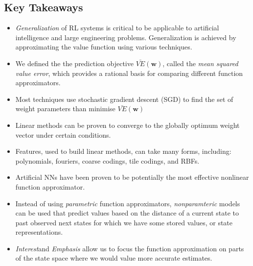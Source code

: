 \subsection{Key Takeaways}
\begin{itemize}
\item \textit{Generalization} of RL systems is critical to be applicable to artificial intelligence and large engineering problems. Generalization is achieved by approximating the value function using various techniques.
\item We defined the the prediction objective $\bar{VE}(\textbf{w})$, called the \textit{mean squared value error}, which provides a rational basis for comparing different function approximators.
\item Most techniques use stochastic gradient descent (SGD) to find the set of weight parameters than minimise $\bar{VE}(\textbf{w})$
\item Linear methods can be proven to converge to the globally optimum weight vector under certain conditions. 
\item Features, used to build linear methods, can take many forms, including: polynomials, fouriers, coarse codings, tile codings, and RBFs.
\item Artificial NNs have been proven to be potentially the most effective nonlinear function approximator.
\item Instead of using \textit{parametric} function approximators, \textit{nonparamteric} models can be used that predict values based on the distance of a current state to past observed next states for which we have some stored values, or state representations.
\item \textit{Interest}and \textit{Emphasis} allow us to focus the function approximation on parts of the state space where we would value more accurate estimates.
\end{itemize}




